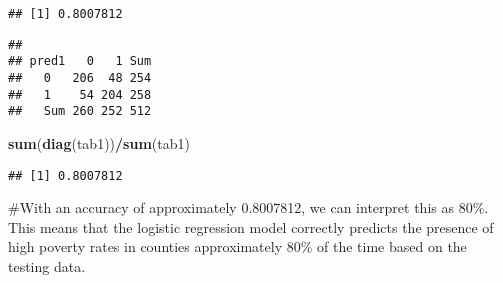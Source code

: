 \documentclass[
]{article}
\newenvironment{Shaded}{\begin{snugshade}}{\end{snugshade}}
\newcommand{\AttributeTok}[1]{\textcolor[rgb]{0.13,0.29,0.53}{#1}}
\newcommand{\CommentTok}[1]{\textcolor[rgb]{0.56,0.35,0.01}{\textit{#1}}}
\newcommand{\DecValTok}[1]{\textcolor[rgb]{0.00,0.00,0.81}{#1}}
\newcommand{\DocumentationTok}[1]{\textcolor[rgb]{0.56,0.35,0.01}{\textbf{\textit{#1}}}}
\newcommand{\FloatTok}[1]{\textcolor[rgb]{0.00,0.00,0.81}{#1}}
\newcommand{\FunctionTok}[1]{\textcolor[rgb]{0.13,0.29,0.53}{\textbf{#1}}}
\newcommand{\NormalTok}[1]{#1}
\newcommand{\OtherTok}[1]{\textcolor[rgb]{0.56,0.35,0.01}{#1}}
\newcommand{\SpecialCharTok}[1]{\textcolor[rgb]{0.81,0.36,0.00}{\textbf{#1}}}
\newcommand{\StringTok}[1]{\textcolor[rgb]{0.31,0.60,0.02}{#1}}
\begin{document}
\begin{verbatim}
## [1] 0.8007812
\end{verbatim}

\begin{Shaded}
\end{Shaded}

\begin{verbatim}
##      
## pred1   0   1 Sum
##   0   206  48 254
##   1    54 204 258
##   Sum 260 252 512
\end{verbatim}

\begin{Shaded}
\begin{Highlighting}[]
 \FunctionTok{sum}\NormalTok{(}\FunctionTok{diag}\NormalTok{(tab1))}\SpecialCharTok{/}\FunctionTok{sum}\NormalTok{(tab1)}
\end{Highlighting}
\end{Shaded}

\begin{verbatim}
## [1] 0.8007812
\end{verbatim}

\#With an accuracy of approximately 0.8007812, we can interpret this as
80\%. This means that the logistic regression model correctly predicts
the presence of high poverty rates in counties approximately 80\% of the
time based on the testing data.
\end{document}
